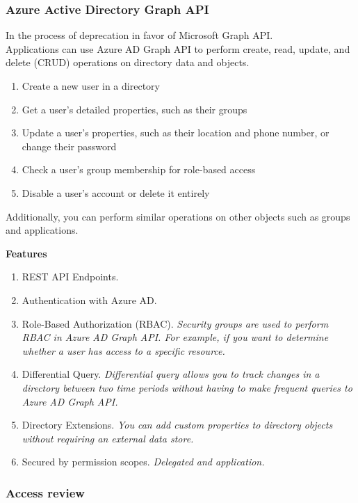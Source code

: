 \subsubsection{Azure Active Directory Graph API}
In the process of deprecation in favor of Microsoft Graph API. \\
Applications can use Azure AD Graph API to perform create, read, update, and delete (CRUD) operations on directory data and objects.
\begin{enumerate}
\item Create a new user in a directory
\item Get a user’s detailed properties, such as their groups
\item Update a user’s properties, such as their location and phone number, or change their password
\item Check a user’s group membership for role-based access
\item Disable a user’s account or delete it entirely
\end{enumerate}
Additionally, you can perform similar operations on other objects such as groups and applications.

\textbf{Features} 
\begin{enumerate}
\item REST API Endpoints.
\item Authentication with Azure AD.
\item Role-Based Authorization (RBAC). \textit{Security groups are used to perform RBAC in Azure AD Graph API. For example, if you want to determine whether a user has access to a specific resource.}
\item Differential Query. \textit{Differential query allows you to track changes in a directory between two time periods without having to make frequent queries to Azure AD Graph API.}
\item Directory Extensions. \textit{You can add custom properties to directory objects without requiring an external data store.}
\item Secured by permission scopes. \textit{Delegated and application.}
\end{enumerate}

\subsubsection{Access review}

